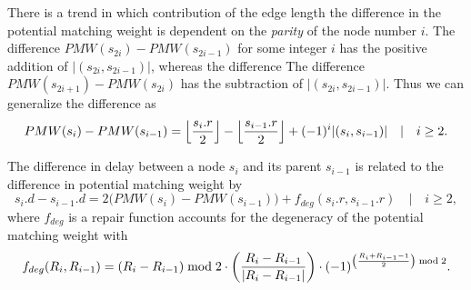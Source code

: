 There is a trend in which contribution of the edge length the difference in the potential matching weight is dependent on the \emph{parity} of the node number $i$. The difference $ PMW(s_{2i}) - PMW(s_{2i-1})$ for some integer $i$ has the positive addition of $|(s_{2i}, s_{2i-1})|$, whereas the difference The difference $ PMW(s_{2i+1}) - PMW(s_{2i})$ has the subtraction of $|(s_{2i}, s_{2i-1})|$. Thus we can generalize the difference as
\begin{equation}\label{eq:pmwdiff}
  PMW(s_i) - PMW(s_{i-1}) = {\left \lfloor \frac{s_i.r}{2} \right \rfloor } - {\left \lfloor \frac{s_{i-1}.r}{2} \right \rfloor } + (-1)^{i}\abs{(s_i,s_{i-1})} \hspace{1em} | \hspace{1em} i\geq 2.
\end{equation}

\begin{lemma}
  The difference in delay between a node $s_i$ and its parent $s_{i-1}$ is related to the difference in potential matching weight by 
  \begin{equation}\label{eq:delaydiff}
    s_i.d - s_{i-1}.d =2\big(PMW(s_i) - PMW(s_{i-1})\big) + f_{deg}(s_i.r, s_{i-1}.r) \hspace{1em} | \hspace{1em} i\geq 2,
  \end{equation}
  where $f_{deg}$ is a repair function accounts for the degeneracy of the potential matching weight with
  \begin{equation}\label{eq:degenrepair}
    f_{deg}(R_i, R_{i-1}) = (R_i - R_{i-1}) \bmod 2 \cdot \left(\frac{R_i - R_{i-1}}{\abs{R_i - R_{i-1}}}\right) \cdot (-1)^{\left(\frac{R_i+R_{i-1}-1}{2}\right)\bmod 2} .
  \end{equation}
\end{lemma}
